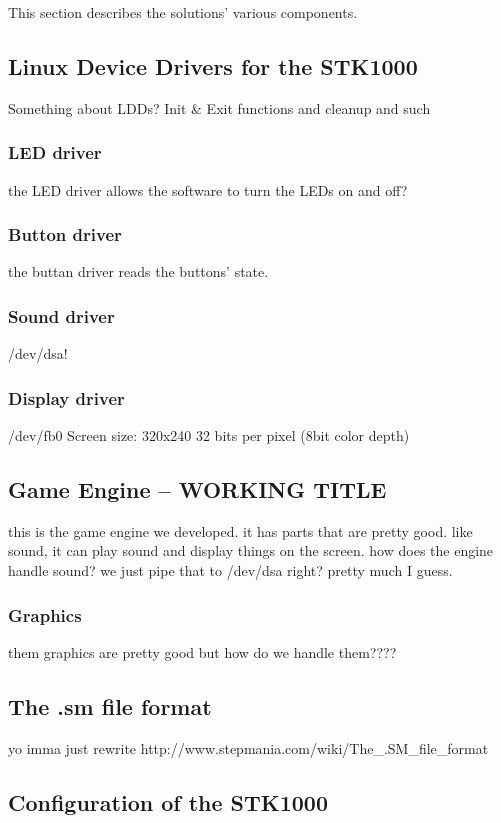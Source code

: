This section describes the solutions' various components.

\subsection{Linux Device Drivers for the STK1000}
	Something about LDDs?
	Init & Exit functions and cleanup and such

	\subsubsection{LED driver}
		the LED driver allows the software to turn the LEDs on and off?
	\subsubsection{Button driver}
		the buttan driver reads the buttons' state.	

	\subsubsection{Sound driver}
		/dev/dsa!
	\subsubsection{Display driver}
		/dev/fb0
		Screen size: 320x240
		32 bits per pixel (8bit color depth)

\subsection{Game Engine -- WORKING TITLE}
	this is the game engine we developed. it has parts that are pretty good. like sound, it can play sound and display things on the screen.
		how does the engine handle sound?
		we just pipe that to /dev/dsa right?
		pretty much I guess.
	\subsubsection{Graphics}
		them graphics are pretty good but how do we handle them????

\subsection{The .sm file format}
	yo imma just rewrite http://www.stepmania.com/wiki/The_.SM_file_format

\subsection{Configuration of the STK1000}
